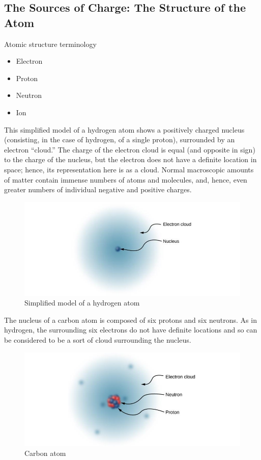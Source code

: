 \documentclass[14pt]{memoir}
\begin{document}
\subsection{The Sources of Charge: The Structure of the Atom}

Atomic structure terminology
\begin{itemize}
\item Electron
\item Proton
\item Neutron
\item Ion
\end{itemize}

This simplified model of a hydrogen atom shows a positively charged nucleus (consisting, in the case of hydrogen, of a single proton), surrounded by an electron “cloud.” The charge of the electron cloud is equal (and opposite in sign) to the charge of the nucleus, but the electron does not have a definite location in space;  hence, its representation here is as a cloud. Normal macroscopic amounts of matter contain immense numbers of atoms and molecules, and, hence, even greater numbers of individual negative and positive charges. 

\begin{figure}[h]
\begin{center}
\includegraphics[scale=0.40]{fig/fig_05_07.jpg}
\caption{Simplified model of a hydrogen atom}
\label{fig:05_07}
\end{center}
\end{figure}

The nucleus of a carbon atom is composed of six protons and six neutrons. As in hydrogen, the surrounding six electrons do not have definite locations and so can be considered to be a sort of cloud surrounding the nucleus.


\begin{figure}[h]
\begin{center}
\includegraphics[scale=0.40]{fig/fig_05_08.jpg}
\caption{Carbon atom}
\label{fig:05_08}
\end{center}
\end{figure}
\end{document}
